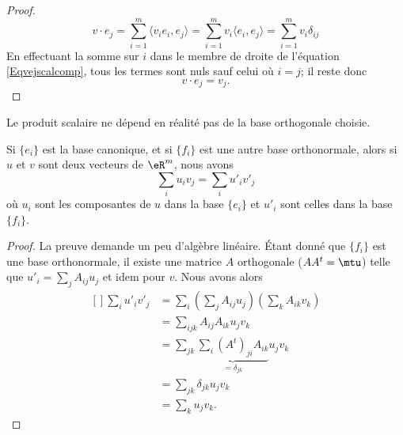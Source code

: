 \begin{proof}
    \begin{equation}    \label{Eqvejscalcomp}
        v\cdot e_j=\sum_{i=1}^m\langle v_ie_i, e_j\rangle =\sum_{i=1}^mv_i\langle e_i, e_j\rangle =\sum_{i=1}^mv_i\delta_{ij}
    \end{equation}
    En effectuant la somme sur \( i\) dans le membre de droite de l'équation \eqref{Eqvejscalcomp}, tous les termes sont nuls sauf celui où \( i=j\); il reste donc
    \begin{equation}
        v\cdot e_j=v_j.
    \end{equation}
\end{proof}

Le produit scalaire ne dépend en réalité pas de la base orthogonale choisie.

\begin{lemma}
    Si \( \{ e_i \}\) est la base canonique, et si \( \{ f_i \}\) est une autre base orthonormale, alors si \( u\) et \( v\) sont deux vecteurs de \( \eR^m\), nous avons
    \begin{equation}
        \sum_i u_iv_j=\sum_iu'_iv'_j
    \end{equation}
    où \( u_i\) sont les composantes de \( u\) dans la base \( \{ e_i \}\) et \( u'_i\) sont celles dans la base \( \{ f_i \}\).
\end{lemma}

\begin{proof}
    La preuve demande un peu d'algèbre linéaire. Étant donné que $\{ f_i \}$ est une base orthonormale, il existe une matrice $A$ orthogonale ($AA^t=\mtu$) telle que $u'_i=\sum_jA_{ij}u_j$ et idem pour $v$. Nous avons alors
    \begin{equation}
      \begin{aligned}[]
        \sum_iu'_iv'_j  & =\sum_i\left( \sum_jA_{ij} u_j\right)\left( \sum_k A_{ik}v_k \right) \\
                        & =\sum_{ijk}A_{ij}A_{ik}u_jv_k                                        \\
                        & =\sum_{jk}\underbrace{\sum_i(A^t)_{ji}A_{ik}}_{=\delta_{jk}}u_jv_k   \\
                        & =\sum_{jk}\delta_{jk}u_jv_k                                          \\
                        & =\sum_ku_jv_k.
      \end{aligned}
    \end{equation}
\end{proof}

